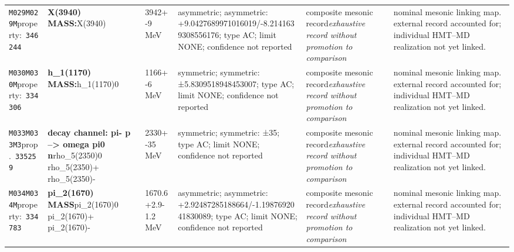 \begin{landscape}
\begin{longtable}{L{1.85cm}L{4.45cm}L{2.35cm}L{4.05cm}L{3.35cm}L{7.15cm}}
\texttt{M029}\newline \texttt{M029M}\newline property:\ \texttt{346244} & \textbf{X(3940) MASS:}\newline X(3940) & 3942+-9\,MeV & asymmetric; asymmetric: +9.0427689971016019/-8.2141639308556176; type AC; limit NONE; confidence not reported & composite mesonic record\newline \emph{exhaustive record without promotion to comparison} & nominal mesonic linking map. external record accounted for; individual HMT--MD realization not yet linked. \\
\texttt{M030}\newline \texttt{M030M}\newline property:\ \texttt{334306} & \textbf{h\_\allowbreak{}1(1170) MASS:}\newline h\_\allowbreak{}1(1170)0 & 1166+-6\,MeV & symmetric; symmetric: ±5.8309518948453007; type AC; limit NONE; confidence not reported & composite mesonic record\newline \emph{exhaustive record without promotion to comparison} & nominal mesonic linking map. external record accounted for; individual HMT--MD realization not yet linked. \\
\texttt{M033}\newline \texttt{M033M3}\newline prop.\ \texttt{335259} & \textbf{decay channel: pi- p --\textgreater{} omega pi0 n}\newline rho\_\allowbreak{}5(2350)0 \textbar{}\allowbreak{} rho\_\allowbreak{}5(2350)+ \textbar{}\allowbreak{} rho\_\allowbreak{}5(2350)- & 2330+-35\,MeV & symmetric; symmetric: ±35; type AC; limit NONE; confidence not reported & composite mesonic record\newline \emph{exhaustive record without promotion to comparison} & nominal mesonic linking map. external record accounted for; individual HMT--MD realization not yet linked. \\
\texttt{M034}\newline \texttt{M034M}\newline property:\ \texttt{334783} & \textbf{pi\_\allowbreak{}2(1670) MASS}\newline pi\_\allowbreak{}2(1670)0 \textbar{}\allowbreak{} pi\_\allowbreak{}2(1670)+ \textbar{}\allowbreak{} pi\_\allowbreak{}2(1670)- & 1670.6+2.9-1.2\,MeV & asymmetric; asymmetric: +2.92487285188664/-1.1987692041830089; type AC; limit NONE; confidence not reported & composite mesonic record\newline \emph{exhaustive record without promotion to comparison} & nominal mesonic linking map. external record accounted for; individual HMT--MD realization not yet linked. \\

\end{longtable}
\end{landscape}
